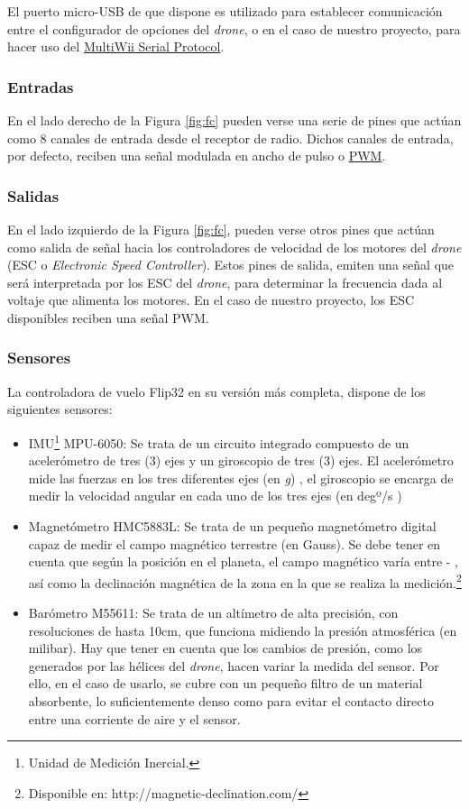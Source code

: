 El puerto micro-USB de que dispone es utilizado para establecer comunicación entre el configurador de opciones del \emph{drone}, o en el caso de nuestro proyecto, para hacer uso del \hyperref[subsec:MSP]{MultiWii Serial Protocol}. 


\subsubsection{Entradas}
En el lado derecho de la Figura \ref{fig:fc} pueden verse una serie de pines que actúan como 8 canales de entrada desde el receptor de radio.
Dichos canales de entrada, por defecto, reciben una señal modulada en ancho de pulso o \hyperref[subsec:PWM]{PWM}.

 

\subsubsection{Salidas}
En el lado izquierdo de la Figura \ref{fig:fc}, pueden verse otros pines que actúan como salida de señal hacia los controladores de velocidad de los motores del \emph{drone} (ESC o \textit{Electronic Speed Controller}).
Estos pines de salida, emiten una señal que será interpretada por los ESC del \emph{drone}, para determinar la frecuencia dada al voltaje que alimenta los motores. En el caso de nuestro proyecto, los ESC disponibles reciben una señal PWM.

\subsubsection{Sensores}
\label{subsubsec:sensors}
La controladora de vuelo Flip32 en su versión más completa, dispone de los siguientes sensores:
\begin{itemize}
\item IMU\footnote{Unidad de Medición Inercial.} MPU-6050: Se trata de un circuito integrado compuesto de un acelerómetro de tres (3) ejes y un giroscopio de tres (3) ejes. El acelerómetro mide las fuerzas en los tres diferentes ejes (en \textit{g}) , el giroscopio se encarga de medir la velocidad angular en cada uno de los tres ejes (en degº/s )
\item Magnetómetro HMC5883L: Se trata de un pequeño magnetómetro digital capaz de medir el campo magnético terrestre (en Gauss). Se debe tener en cuenta que según la posición en el planeta, el campo magnético varía entre \si{} - \si{}, así como la declinación magnética de la zona en la que se realiza la medición.\footnote{Disponible en: http://magnetic-declination.com/}
\item Barómetro M55611: Se trata de un altímetro de alta precisión, con resoluciones de hasta 10cm, que funciona midiendo la presión atmosférica (en milibar). Hay que tener en cuenta que los cambios de presión, como los generados por las hélices del \emph{drone}, hacen variar la medida del sensor. Por ello, en el caso de usarlo, se cubre con un pequeño filtro de un material absorbente, lo suficientemente denso como para evitar el contacto directo entre una corriente de aire y el sensor.
\end{itemize}

